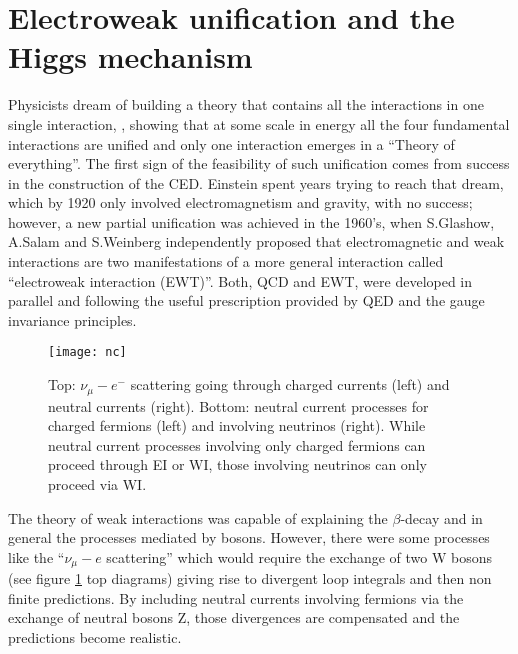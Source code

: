 \section{Electroweak unification and the Higgs mechanism}\label{sec:EWI}

\noindent Physicists dream of building a theory that contains all the interactions in one single interaction, \ie, showing that at some scale in energy all the four fundamental interactions are unified and only one interaction emerges in a ``Theory of everything''. The first sign of the feasibility of such unification comes from success in the construction of the CED. Einstein spent years trying to reach that dream, which by 1920 only involved electromagnetism and gravity, with no success; however, a new partial unification was achieved in the 1960's, when S.Glashow\cite{glashow}, A.Salam\cite{salam} and S.Weinberg \cite{weinberg} independently proposed that electromagnetic and weak interactions are two manifestations of a more general interaction called ``electroweak interaction (EWT)''. Both, QCD and EWT, were developed in parallel and following the useful prescription provided by QED and the gauge invariance principles.\\

\begin{figure}[h!]
  \centering
  \texttt{[image: nc]}
  \caption[Neutral current processes]{Top: $\nu_{\mu}-e^-$ scattering going through charged currents (left) and neutral currents (right). Bottom: neutral current processes for charged fermions (left) and involving neutrinos (right). While neutral current processes involving only charged fermions can proceed through EI or WI, those involving neutrinos can only proceed via WI.}%
         \label{nc}
\end{figure}
         
\noindent The theory of weak interactions was capable of explaining the $\beta$-decay and in general the processes mediated by \wpm bosons. However, there were some processes like the ``$\nu_\mu - e$ scattering'' which would require the exchange of two W bosons (see figure \ref{nc} top diagrams) giving rise to divergent loop integrals and then non finite predictions. By including neutral currents involving fermions via the exchange of neutral bosons Z, those divergences are compensated and the predictions become realistic.\\

